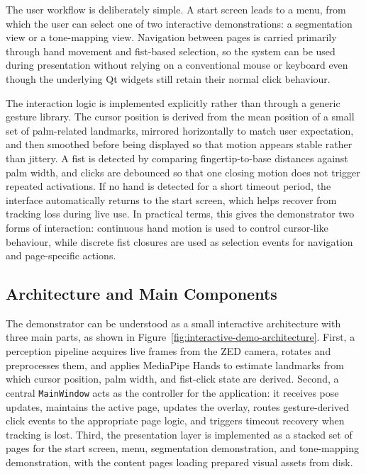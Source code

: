 ﻿\documentclass[11pt,a4paper]{article}
\begin{document}
\medskip

The user workflow is deliberately simple. A start screen leads to a menu, from
which the user can select one of two interactive demonstrations: a
segmentation view or a tone-mapping view. Navigation between pages is carried
primarily through hand movement and fist-based selection, so the system can be
used during presentation without relying on a conventional mouse or keyboard
even though the underlying Qt widgets still retain their normal click
behaviour.

\medskip

The interaction logic is implemented explicitly rather than through a generic
gesture library. The cursor position is derived from the mean position of a
small set of palm-related landmarks, mirrored horizontally to match user
expectation, and then smoothed before being displayed so that motion appears
stable rather than jittery. A fist is detected by comparing fingertip-to-base
distances against palm width, and clicks are debounced so that one closing
motion does not trigger repeated activations. If no hand is detected for a
short timeout period, the interface automatically returns to the start screen,
which helps recover from tracking loss during live use. In practical terms,
this gives the demonstrator two forms of interaction: continuous hand motion is
used to control cursor-like behaviour, while discrete fist closures are used as
selection events for navigation and page-specific actions.

\subsection{Architecture and Main Components}

The demonstrator can be understood as a small interactive architecture with
three main parts, as shown in Figure~\ref{fig:interactive-demo-architecture}.
First, a perception pipeline acquires live frames from the ZED camera, rotates
and preprocesses them, and applies MediaPipe Hands to estimate landmarks from
which cursor position, palm width, and fist-click state are derived. Second, a
central \texttt{MainWindow} acts as the controller for the application: it
receives pose updates, maintains the active page, updates the overlay, routes
gesture-derived click events to the appropriate page logic, and triggers
timeout recovery when tracking is lost. Third, the presentation layer is
implemented as a stacked set of pages for the start screen, menu,
segmentation demonstration, and tone-mapping demonstration, with the content
pages loading prepared visual assets from disk.
\end{document}

